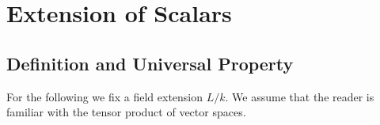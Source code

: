 \section{Extension of Scalars}

\label{appendix: extension of scalars}





\subsection{Definition and Universal Property}

\begin{fluff}
  For the following we fix a field extension $L/k$.
  We assume that the reader is familiar with the tensor product of vector spaces.
\end{fluff}


